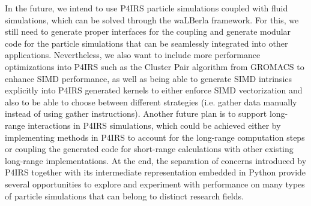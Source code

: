 \documentclass[preprint,12pt]{elsarticle}
\begin{document}
In the future, we intend to use P4IRS particle simulations coupled with fluid simulations, which can be solved through the waLBerla framework.
For this, we still need to generate proper interfaces for the coupling and generate modular code for the particle simulations that can be seamlessly integrated into other applications.
Nevertheless, we also want to include more performance optimizations into P4IRS such as the Cluster Pair algorithm from GROMACS to enhance SIMD performance, as well as being able to generate SIMD intrinsics explicitly into P4IRS generated kernels to either enforce SIMD vectorization and also to be able to choose between different strategies (i.e. gather data manually instead of using gather instructions).
Another future plan is to support long-range interactions in P4IRS simulations, which could be achieved either by implementing methods in P4IRS to account for the long-range computation steps or coupling the generated code for short-range calculations with other existing long-range implementations.
At the end, the separation of concerns introduced by P4IRS together with its intermediate representation embedded in Python provide several opportunities to explore and experiment with performance on many types of particle simulations that can belong to distinct research fields.





 






\end{document}

